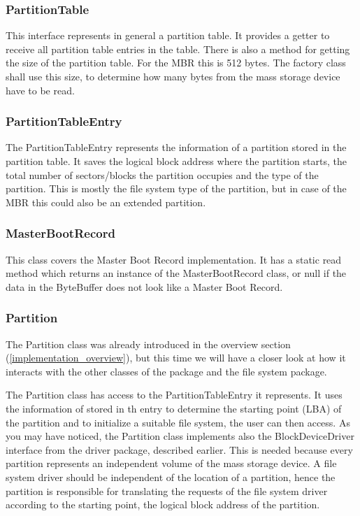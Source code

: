 \subsubsection{PartitionTable}

This interface represents in general a partition table. It provides a getter to receive all partition table entries in the table. There is also a method for getting the size of the partition table. For the MBR this is 512 bytes. The factory class shall use this size, to determine how many bytes from the mass storage device have to be read.

\subsubsection{PartitionTableEntry}

The PartitionTableEntry represents the information of a partition stored in the partition table. It saves the logical block address where the partition starts, the total number of sectors/blocks the partition occupies and the type of the partition. This is mostly the file system type of the partition, but in case of the MBR this could also be an extended partition.

\subsubsection{MasterBootRecord}

This class covers the Master Boot Record implementation. It has a static read method which returns an instance of the MasterBootRecord class, or null if the data in the ByteBuffer does not look like a Master Boot Record.

\subsubsection{Partition}

The Partition class was already introduced in the overview section (\ref{implementation_overview}), but this time we will have a closer look at how it interacts with the other classes of the package and the file system package. 

The Partition class has access to the PartitionTableEntry it represents. It uses the information of stored in th entry to determine the starting point (LBA) of the partition and to initialize a suitable file system, the user can then access. As you may have noticed, the Partition class implements also the BlockDeviceDriver interface from the driver package, described earlier. This is needed because every partition represents an independent volume of the mass storage device. A file system driver should be independent of the location of a partition, hence the partition is responsible for translating the requests of the file system driver according to the starting point, the logical block address of the partition.